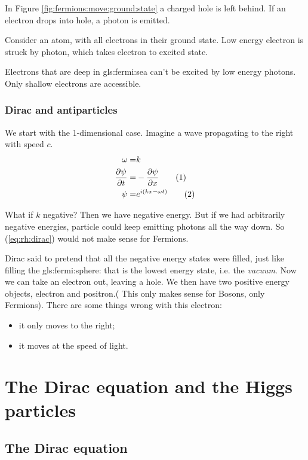 \documentclass[]{article}
\newcommand\numberthis{\addtocounter{equation}{1}\tag{\theequation}}
\begin{document}
In Figure \ref{fig:fermions:move:ground:state} a charged hole is left behind.
If an electron drops into hole, a photon is emitted.

Consider an atom, with all electrons in their ground state. Low energy electron is struck by photon, which takes electron to excited state.

Electrons that are deep in \gls{gls:fermi:sea} can't be excited by low energy photons. Only shallow electrons are accessible.

\subsubsection{Dirac and antiparticles}

We start with the 1-dimensional case. Imagine a wave propagating to the right with speed $c$.
\begin{align*}
	\omega =& k\\
	\frac{\partial \psi}{\partial t} =& - \frac{\partial \psi}{\partial x}  \numberthis \label{eq:rh:dirac}\\
	\psi =& e^{i(kx-\omega t)} \numberthis \label{eq:rh:dirac:wave}
\end{align*}

What if $k$ negative? Then we have negative energy. But if we had arbitrarily negative energies, particle could keep emitting photons all the way down. So (\ref{eq:rh:dirac}) would not make sense for Fermions.

Dirac said to pretend that all the negative energy states were filled, just like filling the \gls{gls:fermi:sphere}: that is the lowest energy state, i.e. the \emph{vacuum}. Now we can take an electron out, leaving a hole. We then have two positive energy objects, electron and positron.( This only makes sense for Bosons, only Fermions). There are some things wrong with this electron:
\begin{itemize}
	\item it only moves to the right;
	\item it moves at the speed of light.
\end{itemize}

\section{The Dirac equation and the Higgs particles}

\subsection{The Dirac equation}
\end{document}
